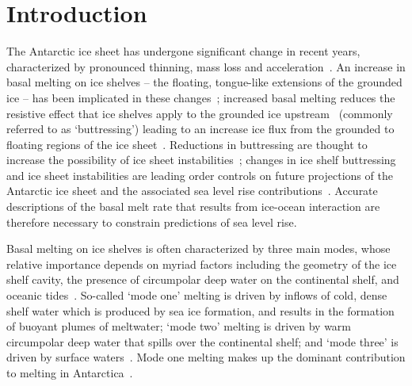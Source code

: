 \documentclass[openacc]{rsproca_new}%
\begin{document}
\begin{fmtext}

\end{fmtext}
\maketitle
\section{Introduction}\label{S:Introduction}
The Antarctic ice sheet has undergone significant change in recent years, characterized by pronounced thinning, mass loss and acceleration~\cite{Pritchard2012Nature, Mouginot2014GRL, Paolo2015Science, Rignot2019PNAS}. An increase in basal melting on ice shelves -- the floating, tongue-like extensions of the grounded ice -- has been implicated in these changes~\cite{Shepherd2004GRL}; increased basal melting reduces the resistive effect that ice shelves apply to the grounded ice upstream~\citep{Gagliardini2010GRL} (commonly referred to as `buttressing') leading to an increase ice flux from the grounded to floating regions of the ice sheet~\citep{Gudmundsson2013Cryo}. Reductions in buttressing are thought to increase the possibility of ice sheet instabilities~\citep{Schoof2007JGeophysResEarth}; changes in ice shelf buttressing and ice sheet instabilities are leading order controls on future projections of the Antarctic ice sheet and the associated sea level rise contributions~\citep{DeConto2016Nature, Arthern2017GRL}. Accurate descriptions of the basal melt rate that results from ice-ocean interaction are therefore necessary to constrain predictions of sea level rise. 

Basal melting on ice shelves is often characterized by three main modes, whose relative importance depends on myriad factors including the geometry of the ice shelf cavity, the presence of circumpolar deep water on the continental shelf, and oceanic tides~\citep{Jacobs1992JGlac}. So-called `mode one' melting is driven by inflows of cold, dense shelf water which is produced by sea ice formation, and results in the formation of buoyant plumes of meltwater; `mode two' melting is driven by warm circumpolar deep water that spills over the continental shelf; and `mode three' is driven by surface waters~\citep{Silvano2016Oceanography}. Mode one melting makes up the dominant contribution to melting in Antarctica~\citep{Adusumilli2020NatureGeo}.
\end{document}

